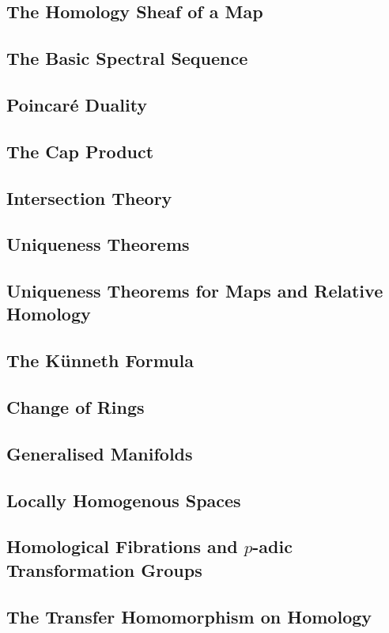 \subsection{The Homology Sheaf of a Map}
\subsection{The Basic Spectral Sequence}
\subsection{Poincaré Duality}
\subsection{The Cap Product}
\subsection{Intersection Theory}
\subsection{Uniqueness Theorems}
\subsection{Uniqueness Theorems for Maps and Relative Homology}
\subsection{The Künneth Formula}
\subsection{Change of Rings}
\subsection{Generalised Manifolds}
\subsection{Locally Homogenous Spaces}
\subsection{Homological Fibrations and $p$-adic Transformation Groups}
\subsection{The Transfer Homomorphism on Homology}
